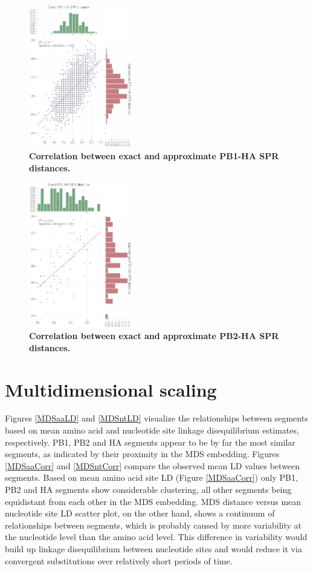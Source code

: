 \documentclass[11pt,oneside,letterpaper]{article}
\begin{document}
\begin{figure}
\centering  
\includegraphics[width=0.4\textwidth]  {supp_figures/InfB_supp_PB1-HA_corr.png}
\caption{\textbf{Correlation between exact and approximate PB1-HA SPR distances.}}
\label{SPR_PB1-HA_correlation}
\end{figure}

\begin{figure}
\centering  
\includegraphics[width=0.4\textwidth]  {supp_figures/InfB_supp_PB2-HA_corr.png}
\caption{\textbf{Correlation between exact and approximate PB2-HA SPR distances.}}
\label{SPR_PB2-HA_correlation}
\end{figure}

\clearpage
\section*{Multidimensional scaling}
Figures \ref{MDSaaLD} and \ref{MDSntLD} visualize the relationships between segments based on mean amino acid and nucleotide site linkage disequilibrium estimates, respectively.
PB1, PB2 and HA segments appear to be by far the most similar segments, as indicated by their proximity in the MDS embedding.
Figures \ref{MDSaaCorr} and \ref{MDSntCorr} compare the observed mean LD values between segments. 
Based on mean amino acid site LD (Figure \ref{MDSaaCorr}) only PB1, PB2 and HA segments show considerable clustering, all other segments being equidistant from each other in the MDS embedding.
MDS distance versus mean nucleotide site LD scatter plot, on the other hand, shows a continuum of relationships between segments, which is probably caused by more variability at the nucleotide level than the amino acid level.
This difference in variability would build up linkage disequilibrium between nucleotide sites and would reduce it via convergent substitutions over relatively short periods of time.
\end{document}
